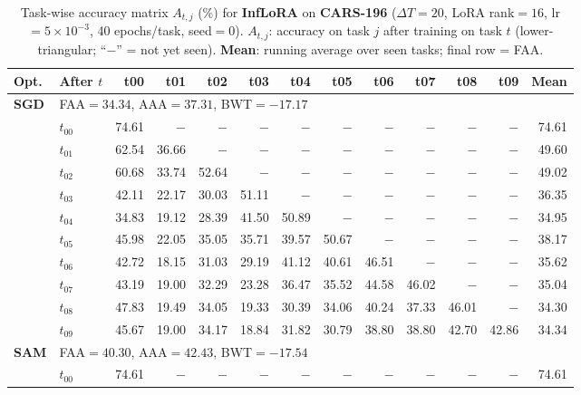 \begin{table}[ht]
\centering
\caption{%
  Task-wise accuracy matrix $A_{t,j}$ (\%) for \textbf{InfLoRA} on \textbf{CARS-196} ($\Delta T=20$, LoRA rank$=16$, lr$=5\times10^{-3}$, 40 epochs/task, seed$=0$).
  $A_{t,j}$: accuracy on task $j$ after training on task $t$  (lower-triangular; ``$-$'' = not yet seen).
  \textbf{Mean}: running average over seen tasks; final row = FAA.
}
\label{tab:raw_inflora_cars196}
\setlength{\tabcolsep}{2.8pt}
\renewcommand{\arraystretch}{0.88}
\scriptsize
\begin{tabular}{@{}l l r r r r r r r r r r r@{}}
\toprule
\textbf{Opt.} & \textbf{After $t$} & \textbf{t00} & \textbf{t01} & \textbf{t02} & \textbf{t03} & \textbf{t04} & \textbf{t05} & \textbf{t06} & \textbf{t07} & \textbf{t08} & \textbf{t09} & \textbf{Mean} \\
\midrule
\multirow{11}{*}{\textbf{SGD}} & \multicolumn{12}{l}{\quad\small FAA$=34.34$,\; AAA$=37.31$,\; BWT$=-17.17$} \\
 & $t_{00}$ & 74.61 & $-$ & $-$ & $-$ & $-$ & $-$ & $-$ & $-$ & $-$ & $-$ & 74.61 \\
 & $t_{01}$ & 62.54 & 36.66 & $-$ & $-$ & $-$ & $-$ & $-$ & $-$ & $-$ & $-$ & 49.60 \\
 & $t_{02}$ & 60.68 & 33.74 & 52.64 & $-$ & $-$ & $-$ & $-$ & $-$ & $-$ & $-$ & 49.02 \\
 & $t_{03}$ & 42.11 & 22.17 & 30.03 & 51.11 & $-$ & $-$ & $-$ & $-$ & $-$ & $-$ & 36.35 \\
 & $t_{04}$ & 34.83 & 19.12 & 28.39 & 41.50 & 50.89 & $-$ & $-$ & $-$ & $-$ & $-$ & 34.95 \\
 & $t_{05}$ & 45.98 & 22.05 & 35.05 & 35.71 & 39.57 & 50.67 & $-$ & $-$ & $-$ & $-$ & 38.17 \\
 & $t_{06}$ & 42.72 & 18.15 & 31.03 & 29.19 & 41.12 & 40.61 & 46.51 & $-$ & $-$ & $-$ & 35.62 \\
 & $t_{07}$ & 43.19 & 19.00 & 32.29 & 23.28 & 36.47 & 35.52 & 44.58 & 46.02 & $-$ & $-$ & 35.04 \\
 & $t_{08}$ & 47.83 & 19.49 & 34.05 & 19.33 & 30.39 & 34.06 & 40.24 & 37.33 & 46.01 & $-$ & 34.30 \\
 & $t_{09}$ & 45.67 & 19.00 & 34.17 & 18.84 & 31.82 & 30.79 & 38.80 & 38.80 & 42.70 & 42.86 & 34.34 \\
\midrule
\multirow{11}{*}{\textbf{SAM}} & \multicolumn{12}{l}{\quad\small FAA$=40.30$,\; AAA$=42.43$,\; BWT$=-17.54$} \\
 & $t_{00}$ & 74.61 & $-$ & $-$ & $-$ & $-$ & $-$ & $-$ & $-$ & $-$ & $-$ & 74.61 \\

\end{tabular}
\end{table}
